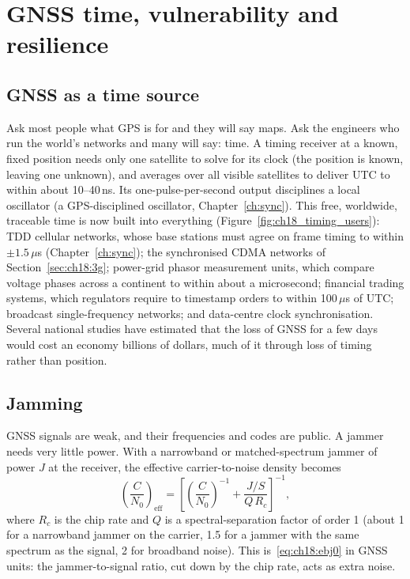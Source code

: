 \section{GNSS time, vulnerability and resilience}
\label{sec:ch18:vulnerability}

\subsection{GNSS as a time source}

Ask most people what GPS is for and they will say maps. Ask the engineers who run the world's
networks and many will say: time. A timing receiver at a known, fixed position needs only one
satellite to solve for its clock (the position is known, leaving one unknown), and averages over
all visible satellites to deliver UTC to within about 10--40\,ns. Its one-pulse-per-second output
disciplines a local oscillator (a GPS-disciplined oscillator, Chapter~\ref{ch:sync}). This free,
worldwide, traceable time is now built into everything (Figure~\ref{fig:ch18_timing_users}): TDD
cellular networks, whose base stations must agree on frame timing to within $\pm1.5\,\mu$s
(Chapter~\ref{ch:sync}); the synchronised CDMA networks of Section~\ref{sec:ch18:3g}; power-grid
phasor measurement units, which compare voltage phases across a continent to within about a
microsecond; financial trading systems, which regulators require to timestamp orders to within
100\,$\mu$s of UTC; broadcast single-frequency networks; and data-centre clock synchronisation.
Several national studies have estimated that the loss of GNSS for a few days would cost an
economy billions of dollars, much of it through loss of timing rather than position.


\subsection{Jamming}

GNSS signals are weak, and their frequencies and codes are public. A jammer needs very little
power. With a narrowband or matched-spectrum jammer of power $J$ at the receiver, the
effective carrier-to-noise density becomes
\begin{equation}
\left(\frac{C}{N_0}\right)_{\text{eff}}=\left[\left(\frac{C}{N_0}\right)^{-1}+\frac{J/S}{Q\,R_c}\right]^{-1},
\label{eq:ch18:jamcn0}
\end{equation}
where $R_c$ is the chip rate and $Q$ is a spectral-separation factor of order 1 (about 1 for a
narrowband jammer on the carrier, 1.5 for a jammer with the same spectrum as the signal, 2 for
broadband noise). This is~\eqref{eq:ch18:ebj0} in GNSS units: the jammer-to-signal ratio, cut down
by the chip rate, acts as extra noise.

